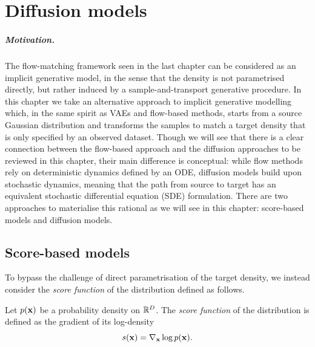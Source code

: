\chapter{Diffusion models}


\paragraph{Motivation.}

The flow-matching framework seen in the last chapter can be considered as an implicit generative model, in the sense that the density is not parametrised directly, but rather induced by a sample-and-transport generative procedure. In this chapter we take an alternative approach to implicit generative modelling which, in the same spirit as VAEs and flow-based methods, starts from a source Gaussian distribution and transforms the samples to match a target density that is only specified by an observed dataset. Though we will see that there is a clear connection between the flow-based approach and the diffusion approaches to be reviewed in this chapter, their main difference is conceptual: while flow methods rely on deterministic dynamics defined by an ODE, diffusion models build upon stochastic dynamics, meaning that the path from source to target has an equivalent stochastic differential equation (SDE) formulation. There are two approaches to materialise this rational as we will see in this chapter: score-based models and diffusion models.

\section{Score-based models}

To bypass the challenge of direct parametrisation of the target density, we instead consider the \emph{score function} of the distribution defined as follows.

\begin{definition}
\label{def:score_function}
Let $p({ \mathbf{x}})$ be a probability density on ${\mathbb R}^D$. The \emph{score function} of the distribution is defined as the gradient of its log-density
\begin{equation}
    \label{eq:score_function}
    s({ \mathbf{x}}) = \nabla_{ \mathbf{x}} \log p({ \mathbf{x}}).
\end{equation}
\end{definition}

